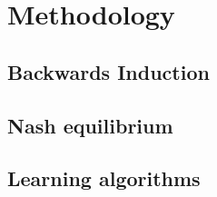 \section{Methodology}
\subsection{Backwards Induction}
\subsection{Nash equilibrium}
\subsection{Learning algorithms}
